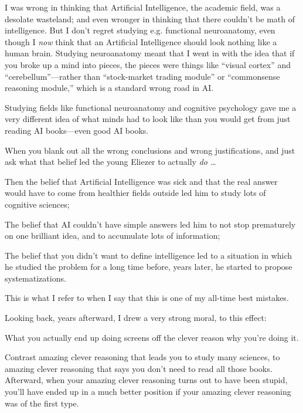 {
 I was wrong in thinking that Artificial Intelligence, the academic
field, was a desolate wasteland; and even wronger in thinking that
there couldn't be math of intelligence. But I
don't regret studying e.g. functional neuroanatomy,
even though I \textit{now} think that an Artificial Intelligence should
look nothing like a human brain. Studying neuroanatomy meant that I
went in with the idea that if you broke up a mind into pieces, the
pieces were things like ``visual
cortex'' and
``cerebellum''---rather than
``stock-market trading module'' or
``commonsense reasoning module,''
which is a standard wrong road in AI.}

{
 Studying fields like functional neuroanatomy and cognitive
psychology gave me a very different idea of what minds had to look like
than you would get from just reading AI books---even good AI books.}

{
 When you blank out all the wrong conclusions and wrong
justifications, and just ask what that belief led the young Eliezer to
actually \textit{do \ldots}}

{
 Then the belief that Artificial Intelligence was sick and that the
real answer would have to come from healthier fields outside led him to
study lots of cognitive sciences;}

{
 The belief that AI couldn't have simple answers
led him to not stop prematurely on one brilliant idea, and to
accumulate lots of information;}

{
 The belief that you didn't want to define
intelligence led to a situation in which he studied the problem for a
long time before, years later, he started to propose systematizations.}

{
 This is what I refer to when I say that this is one of my all-time
best mistakes.}

{
 Looking back, years afterward, I drew a very strong moral, to this
effect:}

{
 What you actually end up doing screens off the clever reason why
you're doing it.}

{
 Contrast amazing clever reasoning that leads you to study many
sciences, to amazing clever reasoning that says you
don't need to read all those books. Afterward, when
your amazing clever reasoning turns out to have been stupid,
you'll have ended up in a much better position if your
amazing clever reasoning was of the first type.}

